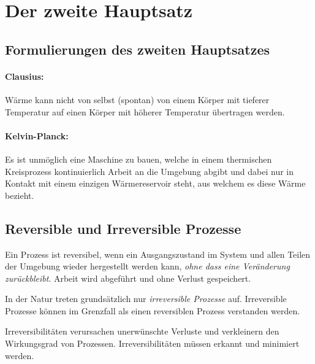 
\section{Der zweite Hauptsatz} %
	\subsection{Formulierungen des zweiten Hauptsatzes} %
		\paragraph{Clausius:} %
			Wärme kann nicht von selbst (spontan) von einem Körper mit tieferer Temperatur auf einen Körper mit höherer Temperatur übertragen werden.
		
		\paragraph{Kelvin-Planck:} %
			Es ist unmöglich eine Maschine zu bauen, welche in einem thermischen
			Kreisprozess kontinuierlich Arbeit an die Umgebung abgibt und dabei nur
			in Kontakt mit einem einzigen Wärmereservoir steht, aus welchem es diese
			Wärme bezieht.
	
	\subsection{Reversible und Irreversible Prozesse} %
		Ein Prozess ist reversibel, wenn ein Ausgangszustand im System und allen Teilen der Umgebung wieder hergestellt werden kann, \emph{ohne dass eine Ver\-än\-de\-rung zu\-rück\-bleibt}. Arbeit wird ab\-ge\-führt und ohne Verlust gespeichert.
		
		In der Natur treten grundsätzlich nur \emph{irreversible Prozesse} auf. Irreversible Prozesse können im Grenzfall als einen reversiblen Prozess verstanden werden.
		
		Irreversibilitäten verursachen unerwünschte Verluste und verkleinern den Wirkungsgrad von Prozessen. Irreversibilitäten müssen erkannt und minimiert werden.
	
